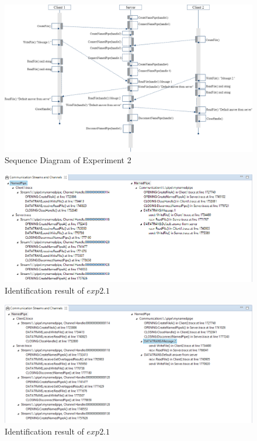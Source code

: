 \begin{figure}[H]
\centerline{\includegraphics[scale=0.48]{Figures/exp2}}
 \caption{Sequence Diagram of Experiment 2}
\label{exp2}
\end{figure}

\begin{figure}[H]
\centerline{\includegraphics[scale=0.6]{Figures/result21}}
 \caption{Identification result of $exp2.1$}
\label{result21}
\end{figure}

\begin{figure}[H]
\centerline{\includegraphics[scale=0.6]{Figures/result22}}
 \caption{Identification result of $exp2.1$}
\label{result22}
\end{figure}


